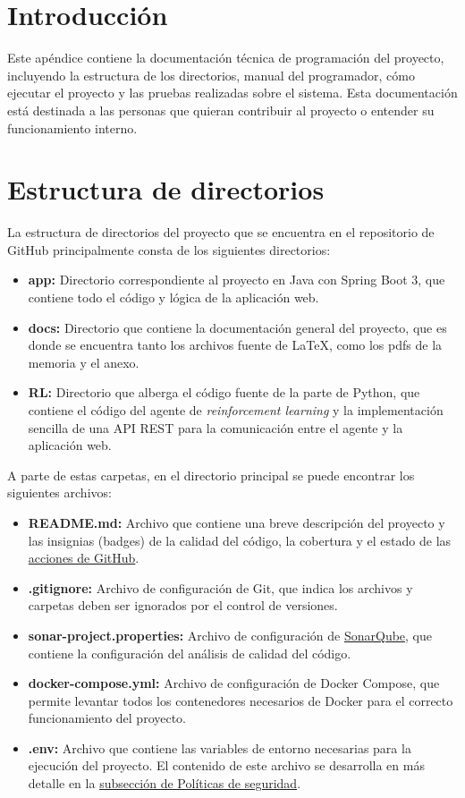 
\section{Introducción}
Este apéndice contiene la documentación técnica de programación del proyecto, incluyendo la estructura de los directorios, manual del programador, cómo ejecutar el proyecto y las pruebas realizadas sobre el sistema. Esta documentación está destinada a las personas que quieran contribuir al proyecto o entender su funcionamiento interno.

\section{Estructura de directorios}
\label{sec:estructura-directorios}

La estructura de directorios del proyecto que se encuentra en el repositorio de GitHub principalmente consta de los siguientes directorios:
\begin{itemize}
    \item \textbf{app:} Directorio correspondiente al proyecto en Java con Spring Boot 3, que contiene todo el código y lógica de la aplicación web.
    \item \textbf{docs:} Directorio que contiene la documentación general del proyecto, que es donde se encuentra tanto los archivos fuente de LaTeX, como los pdfs de la memoria y el anexo.
    \item \textbf{RL:} Directorio que alberga el código fuente de la parte de Python, que contiene el código del agente de \textit{reinforcement learning} y la implementación sencilla de una API REST para la comunicación entre el agente y la aplicación web.
\end{itemize}
A parte de estas carpetas, en el directorio principal se puede encontrar los siguientes archivos:
\begin{itemize}
    \item \textbf{README.md:} Archivo que contiene una breve descripción del proyecto y las insignias (badges) de la calidad del código, la cobertura y el estado de las \hyperref[subsec:acciones]{acciones de GitHub}.    
    \item \textbf{.gitignore:} Archivo de configuración de Git, que indica los archivos y carpetas deben ser ignorados por el control de versiones.
    \item \textbf{sonar-project.properties:} Archivo de configuración de \hyperref[subsec:sonarqube]{SonarQube}, que contiene la configuración del análisis de calidad del código.
    \item \textbf{docker-compose.yml:} Archivo de configuración de Docker Compose, que permite levantar todos los contenedores necesarios  de Docker para el correcto funcionamiento del proyecto.
    \item \textbf{.env:} Archivo que contiene las variables de entorno necesarias para la ejecución del proyecto. El contenido de este archivo se desarrolla en más detalle en la \hyperref[subsec:politicas]{subsección de Políticas de seguridad}.
\end{itemize}


